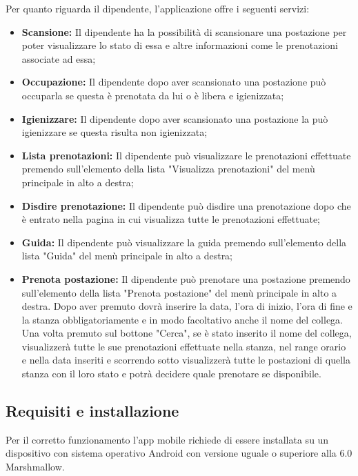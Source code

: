 Per quanto riguarda il dipendente, l'applicazione offre i seguenti servizi:
\begin{itemize}
	\item \textbf{Scansione:} Il dipendente ha la possibilità di scansionare una postazione per poter visualizzare lo stato di essa e altre informazioni come le prenotazioni associate ad essa; \\
	\item \textbf{Occupazione:} Il dipendente dopo aver scansionato una postazione può occuparla se questa è prenotata da lui o è libera e igienizzata; \\
	\item \textbf{Igienizzare:} Il dipendente dopo aver scansionato una postazione la può igienizzare se questa risulta non igienizzata; \\
	\item \textbf{Lista prenotazioni:} Il dipendente può visualizzare le prenotazioni effettuate premendo sull'elemento della lista "Visualizza prenotazioni" del menù principale in alto a destra; \\
	\item \textbf{Disdire prenotazione:} Il dipendente può disdire una prenotazione dopo che è entrato nella pagina in cui visualizza tutte le prenotazioni effettuate; \\
	\item \textbf{Guida:} Il dipendente può visualizzare la guida premendo sull'elemento della lista "Guida" del menù principale in alto a destra; \\
	\item \textbf{Prenota postazione:} Il dipendente può prenotare una postazione premendo sull'elemento della lista "Prenota postazione" del menù principale in alto a destra.
	Dopo aver premuto dovrà inserire la data, l'ora di inizio, l'ora di fine e la stanza obbligatoriamente e in modo facoltativo anche il nome del collega.
	Una volta premuto sul bottone "Cerca", se è stato inserito il nome del collega, visualizzerà tutte le sue prenotazioni effettuate nella stanza, nel range orario e nella data inseriti e scorrendo sotto visualizzerà tutte le postazioni di quella stanza con il loro stato e potrà decidere quale prenotare se disponibile. \\	
\end{itemize}

\subsection{Requisiti e installazione}
	Per il corretto funzionamento l'app mobile richiede di essere installata su un dispositivo con sistema operativo Android con versione uguale o superiore alla 6.0 Marshmallow.
	
